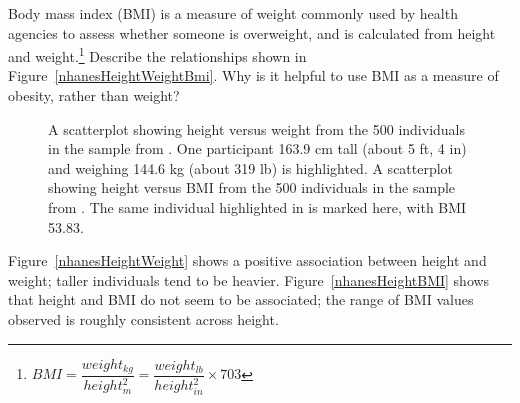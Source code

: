 \begin{example}{Body mass index (BMI) is a measure of weight commonly used by health agencies to assess whether someone is overweight, and is calculated from height and weight.\footnote{$BMI = \dfrac{weight_{kg}}{height^{2}_m} = \dfrac{weight_{lb}}{height^{2}_{in}} \times 703$} Describe the relationships shown in Figure~\ref{nhanesHeightWeightBmi}. Why is it helpful to use BMI as a measure of obesity, rather than weight?

	\begin{figure}[h!]
		\centering
		\caption{ A scatterplot showing height versus weight from the 500 individuals in the sample from . One participant 163.9 cm tall (about 5 ft, 4 in) and weighing 144.6 kg (about 319 lb) is highlighted.  A scatterplot showing height versus BMI from the 500 individuals in the sample from . The same individual highlighted in  is marked here, with BMI 53.83.}
		\label{nhanesHeightWeightBMI}
	\end{figure}	
	
}

Figure~\ref{nhanesHeightWeight}	shows a positive association between height and weight; taller individuals tend to be heavier. Figure~\ref{nhanesHeightBMI} shows that height and BMI do not seem to be associated; the range of BMI values observed is roughly consistent across height. 


\end{example}
